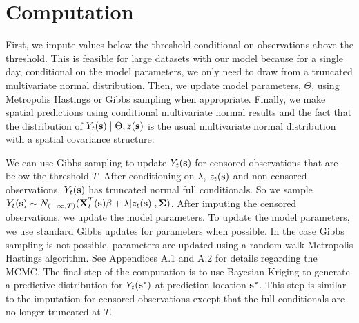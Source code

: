 \documentclass[11pt]{article}
\begin{document}
\section{Computation}\label{s:comp}
First, we impute values below the threshold conditional on observations above the threshold.
This is feasible for large datasets with our model because for a single day, conditional on the model parameters, we only need to draw from a truncated multivariate normal distribution.
Then, we update model parameters, $\Theta$, using Metropolis Hastings or Gibbs sampling when appropriate.
Finally, we make spatial predictions using conditional multivariate normal results and the fact that the distribution of $Y_t(\mbox{\bf s}) \mid \Theta, z(\mbox{\bf s})$ is the usual multivariate normal distribution with a \Matern spatial covariance structure.

We can use Gibbs sampling to update $Y_t(\mbox{\bf s})$ for censored observations that are below the threshold $T$.
After conditioning on $\lambda$, $z_t(\mbox{\bf s})$ and non-censored observations, $Y_t(\mbox{\bf s})$ has truncated normal full conditionals.
So we sample $Y_t(\mbox{\bf s}) \sim N_{(-\infty, T)}(\mbox{\bf X}_t^T(\mbox{\bf s}) \beta + \lambda | z_t(\mbox{\bf s})|, \mbox{\boldmath $\Sigma$})$.
After imputing the censored observations, we update the model parameters.
To update the model parameters, we use standard Gibbs updates for parameters when possible.
In the case Gibbs sampling is not possible, parameters are updated using a random-walk Metropolis Hastings algorithm.
See Appendices A.1 and A.2 for details regarding the MCMC.
The final step of the computation is to use Bayesian Kriging to generate a predictive distribution for $Y_t(\mbox{\bf s}^*)$ at prediction location $\mbox{\bf s}^*$.
This step is similar to the imputation for censored observations except that the full conditionals are no longer truncated at $T$.
\end{document}
